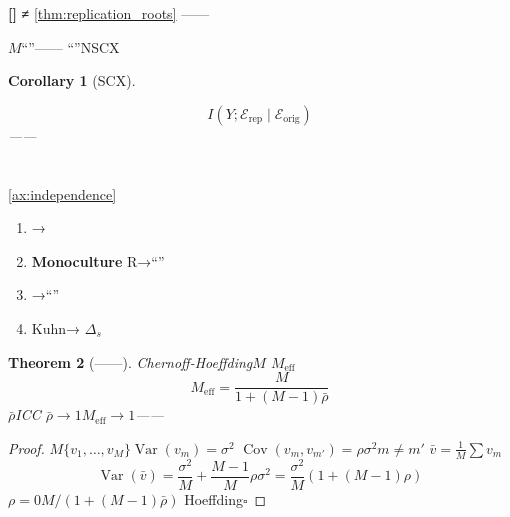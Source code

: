\documentclass[11pt,a4paper]{article}
\newtheorem{theorem}{Theorem}[section]
\newtheorem{corollary}[theorem]{Corollary}
\theoremstyle{remark}
\DeclareMathOperator{\Cov}{Cov}
\DeclareMathOperator{\Var}{Var}
\newcommand{\honeststrike}{\textnormal{\textbf{[]}}}
\begin{document}
\honeststrike{} \textbf{≠}
\ref{thm:replication_roots}
\textbf{}——

$M$``''——
``''NSCX

\begin{corollary}[SCX]
\label{cor:replication_fix}

\begin{equation}
    \boxed{I(Y; \mathcal{E}_{\text{rep}} \mid \mathcal{E}_{\text{orig}})}
\end{equation}
——\textbf{}
\textbf{}

\end{corollary}

\section{}

\subsection{}

\ref{ax:independence}


\begin{enumerate}[label=(\arabic*)]
    \item \textbf{}→
    \item \textbf{Monoculture}
          R→``''
    \item \textbf{}→``''
          
    \item \textbf{}Kuhn→
          $\Delta_s$
\end{enumerate}

\begin{theorem}[——]
\label{thm:effective_experts}
Chernoff-Hoeffding$M$
\textbf{}$M_{\text{eff}}$
\begin{equation}
    \boxed{M_{\text{eff}} = \frac{M}{1 + (M-1)\bar{\rho}}}
\end{equation}
$\bar{\rho}$ICC
$\bar{\rho} \to 1$$M_{\text{eff}} \to 1$——
\end{theorem}

\begin{proof}
$M$$\{v_1, \ldots, v_M\}$$\Var(v_m) = \sigma^2$
$\Cov(v_m, v_{m'}) = \rho\sigma^2$$m \neq m'$
$\bar{v} = \frac{1}{M}\sum v_m$
\begin{equation}
    \Var(\bar{v}) = \frac{\sigma^2}{M} + \frac{M-1}{M}\rho\sigma^2
    = \frac{\sigma^2}{M}\left(1 + (M-1)\rho\right)
\end{equation}
$\rho = 0$$M/(1 + (M-1)\bar{\rho})$
Hoeffding\hfill $\square$
\end{proof}
\end{document}
